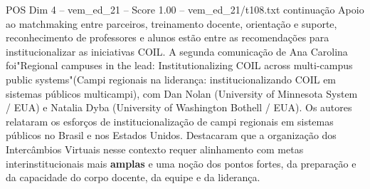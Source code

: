 \begin{textsample}{POS Dim 4 – vem\_ed\_21 – Score 1.00 – vem\_ed\_21/t108.txt}  \label{ex:f4_pos_101}
continuação Apoio ao matchmaking entre parceiros, treinamento docente, orientação e suporte, reconhecimento de professores e alunos estão entre as recomendações para institucionalizar as iniciativas COIL.
A segunda comunicação de Ana Carolina foi"Regional campuses in the lead: Institutionalizing COIL across multi-campus public systems"(Campi regionais na liderança: institucionalizando COIL em sistemas públicos multicampi), com Dan Nolan (University of Minnesota System / EUA) e Natalia Dyba (University of Washington Bothell / EUA).
Os autores relataram os esforços de institucionalização de campi regionais em sistemas públicos no Brasil e nos Estados Unidos.
Destacaram que a organização dos Intercâmbios Virtuais nesse contexto requer alinhamento com metas interinstitucionais mais \textbf{amplas} e uma noção dos pontos fortes, da preparação e da capacidade do corpo docente, da equipe e da liderança.

\end{textsample}
